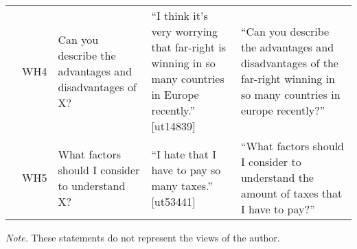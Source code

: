 \documentclass[11pt]{article}
\begin{document}
{\begin{tabular}{p{1.5cm} p{1.5cm} p{4cm} p{4cm} p{4.5cm}}
\addlinespace[0.7em]
 & WH4 & Can you describe the advantages and disadvantages of X? & “I think it's very worrying that far-right is winning in so many countries in Europe recently.” [ut14839] & “Can you describe the advantages and disadvantages of the far-right winning in so many countries in europe recently?” \\
\addlinespace[0.7em]
 & WH5 & What factors should I consider to understand X? & “I hate that I have to pay so many taxes.” [ut53441] & “What factors should I consider to understand the amount of taxes that I have to pay?” \\
\bottomrule
\end{tabular}
}

\vspace{1em}
\begin{center}
\begin{minipage}{16.2cm}
{\fontsize{11}{13}\selectfont
\textit{Note.} These statements do not represent the views of the author.
}
\end{minipage}
\end{center}
\end{document}

